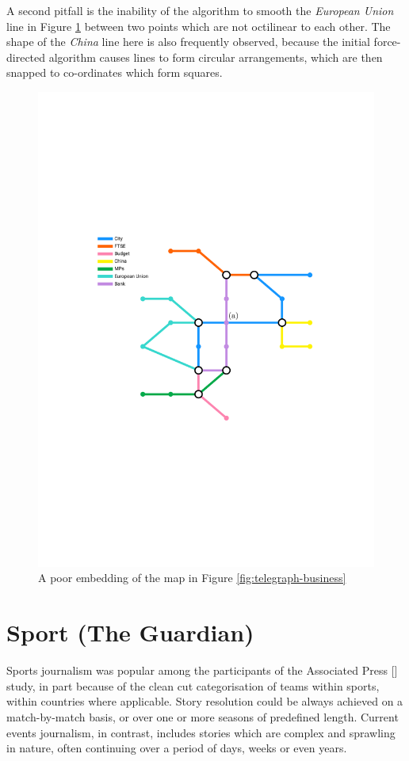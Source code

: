 A second pitfall is the inability of the algorithm to smooth the \textit{European Union} line in Figure \ref{fig:telegraph-business-poor} between two points which are not octilinear to each other. The shape of the \textit{China} line here is also frequently observed, because the initial force-directed algorithm causes lines to form circular arrangements, which are then snapped to co-ordinates which form squares.
\begin{figure}[htbp!]
	\centering
	\includegraphics[width=.8\textwidth]{img/results/telegraph-business-poor.pdf}
	\caption{A poor embedding of the map in Figure \ref{fig:telegraph-business}}
	\label{fig:telegraph-business-poor}
\end{figure}


\section{Sport (The Guardian) \label{sec:sport}}

Sports journalism was popular among the participants of the Associated Press [\citeyear{anewmodelfornews}] study, in part because of the clean cut categorisation of teams within sports, within countries where applicable. Story resolution could be always achieved on a match-by-match basis, or over one or more seasons of predefined length. Current events journalism, in contrast, includes stories which are complex and sprawling in nature, often continuing over a period of days, weeks or even years.

